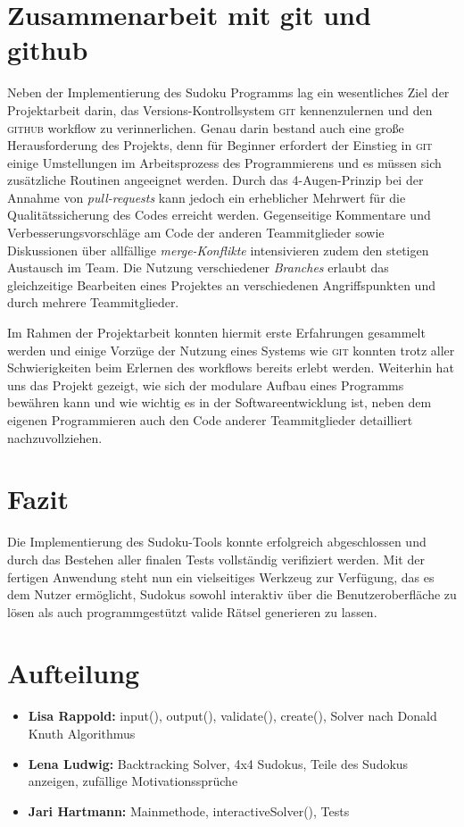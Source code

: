 \documentclass[a4paper,10pt]{article}
\begin{document}
\section*{Zusammenarbeit mit git und github}
Neben der Implementierung des Sudoku Programms lag ein wesentliches Ziel der Projektarbeit darin, das Versions-Kontrollsystem \textsc{git} kennenzulernen und den \textsc{github} workflow zu verinnerlichen. Genau darin bestand auch eine große Herausforderung des Projekts, denn für Beginner erfordert der Einstieg in \textsc{git} einige Umstellungen im Arbeitsprozess des Programmierens und es müssen sich zusätzliche Routinen angeeignet werden. 
Durch das 4-Augen-Prinzip bei der Annahme von \textit{pull-requests} kann jedoch ein erheblicher Mehrwert für die Qualitätssicherung des Codes erreicht werden. Gegenseitige Kommentare und Verbesserungsvorschläge am Code der anderen Teammitglieder sowie Diskussionen über allfällige \textit{merge-Konflikte} intensivieren zudem den stetigen Austausch im Team. Die Nutzung verschiedener \textit{Branches} erlaubt das gleichzeitige Bearbeiten eines Projektes an verschiedenen Angriffspunkten und durch mehrere Teammitglieder.

Im Rahmen der Projektarbeit konnten hiermit erste Erfahrungen gesammelt werden und einige Vorzüge der Nutzung eines Systems wie \textsc{git} konnten trotz aller Schwierigkeiten beim Erlernen des workflows bereits erlebt werden. Weiterhin hat uns das Projekt gezeigt, wie sich der modulare Aufbau eines Programms bewähren kann und wie wichtig es in der Softwareentwicklung ist, neben dem eigenen Programmieren auch den Code anderer Teammitglieder detailliert nachzuvollziehen.

\section*{Fazit}

Die Implementierung des Sudoku-Tools konnte erfolgreich abgeschlossen und durch das Bestehen aller finalen Tests vollständig verifiziert werden. Mit der fertigen Anwendung steht nun ein vielseitiges Werkzeug zur Verfügung, das es dem Nutzer ermöglicht, Sudokus sowohl interaktiv über die Benutzeroberfläche zu lösen als auch programmgestützt valide Rätsel generieren zu lassen.



\section*{Aufteilung}
\begin{itemize}
\item \textbf{Lisa Rappold:} input(), output(), validate(), create(), Solver nach Donald Knuth Algorithmus
\item \textbf{Lena Ludwig:} Backtracking Solver, 4x4 Sudokus, Teile des Sudokus anzeigen, zufällige Motivationssprüche 
\item \textbf{Jari Hartmann:} Mainmethode, interactiveSolver(), Tests
\end{itemize}

\nocite{*}


\end{document}
